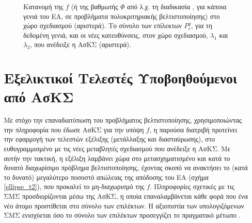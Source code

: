 \begin{figure}[h!]
\begin{minipage}[b]{1\linewidth}
 \centering
\end{minipage}
\caption{Κατανομή της $f$ (ή της βαθμωτής $\Phi$ από λ.χ. τη διαδικασία , για κάποια γενιά του ΕΑ, σε προβλήματα πολυκριτηριακής βελτιστοποίησης) στο χώρο σχεδιασμού (αριστερά). Το σύνολο των επίλεκτων $P^g_e$, για τη δεδομένη γενιά, και οι νέες κατευθύνσεις, στον χώρο σχεδιασμού,  $\lambda_1$ και $\lambda_2$, που ανέδειξε η ΑσΚΣ (αριστερά).} 
\label{reco1}
\end{figure}
       

\section{Εξελικτικοί Τελεστές Υποβοηθούμενοι από ΑσΚΣ} 

Με στόχο την επαναδιατύπωση του προβλήματος βελτιστοποίησης, χρησιμοποιώντας την πληροφορία που έδωσε  ΑσΚΣ για την υπόψη $f$, η παρούσα διατριβή προτείνει την εφαρμογή των τελεστών εξέλιξης (μετάλλαξης και διασταύρωσης), στο ευθυγραμμισμένο με τις νέες μεταβλητές σχεδιασμού που ανέδειξε η ΑσΚΣ. Με αυτήν την τακτική, η εξέλιξη λαμβάνει χώρα στο μετασχηματισμένο και κατά το δυνατό διαχωρίσιμο πρόβλημα βελτιστοποίησης, έχοντας σκοπό να ανακτήσει το (κατά το δυνατό) μεγαλύτερο ποσοστό απώλειας της απόδοσης του ΕΑ (σχήμα \ref{ellipse_t2}), που προκαλεί το μη-διαχωρισμό της $f$. Πληροφορίες σχετικές με τις ΣΜΣ προσδιορίζονται μέσω της ΑσΚΣ, η οποία επαναλαμβάνεται κάθε φορά που ένα νέο άτομο προστίθεται στο σύνολο των επιλέκτων. Η αξιοπιστία των υπολογιζόμενων ΣΜΣ ενισχύεται όσο το σύνολο των επιλέκτων προσεγγίζει το πραγματικό μέτωπο .              

